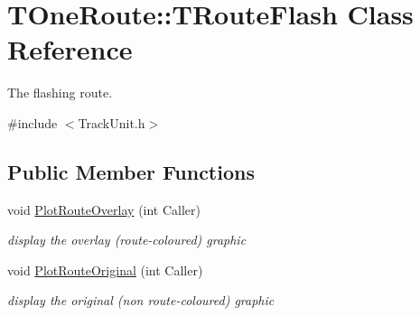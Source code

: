 \hypertarget{class_t_one_route_1_1_t_route_flash}{}\section{T\+One\+Route\+:\+:T\+Route\+Flash Class Reference}
\label{class_t_one_route_1_1_t_route_flash}


The flashing route.  




{\ttfamily \#include $<$Track\+Unit.\+h$>$}

\subsection*{Public Member Functions}
\begin{DoxyCompactItemize}
\item 
\mbox{\label{class_t_one_route_1_1_t_route_flash_a0292e6d0f38d48da408bb85a60f17944}} 
void \mbox{\hyperlink{class_t_one_route_1_1_t_route_flash_a0292e6d0f38d48da408bb85a60f17944}{Plot\+Route\+Overlay}} (int Caller)
\begin{DoxyCompactList}\small\item\em display the overlay (route-\/coloured) graphic \end{DoxyCompactList}\item 
\mbox{\label{class_t_one_route_1_1_t_route_flash_a08346a8f10834cc575c175238c7e84ae}} 
void \mbox{\hyperlink{class_t_one_route_1_1_t_route_flash_a08346a8f10834cc575c175238c7e84ae}{Plot\+Route\+Original}} (int Caller)
\begin{DoxyCompactList}\small\item\em display the original (non route-\/coloured) graphic \end{DoxyCompactList}\end{DoxyCompactItemize}
